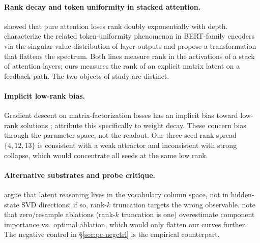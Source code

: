 \paragraph{Rank decay and token uniformity in stacked attention.}
\citet{dong2021attention} showed that pure attention loses rank
doubly exponentially with depth. \citet{yan2022uniformity}
characterize the related token-uniformity phenomenon in
BERT-family encoders via the singular-value distribution of layer
outputs and propose a transformation that flattens the spectrum.
Both lines measure rank in the activations of a stack of
attention layers; ours measures the rank of an explicit matrix
latent on a feedback path. The two objects of study are distinct.

\paragraph{Implicit low-rank bias.}
Gradient descent on matrix-factorization losses has an implicit
bias toward low-rank solutions
\citep{gunasekar2017implicit,arora2019implicit,razin2020implicit};
\citet{kobayashi2024weightdecay} attribute this specifically to
weight decay. These concern bias through the parameter space, not
the readout. Our three-seed rank spread $\{4,12,13\}$ is consistent
with a weak attractor and inconsistent with strong collapse, which
would concentrate all seeds at the same low rank.

\paragraph{Alternative substrates and probe critique.}
\citet{wang2025latentvocab} argue that latent reasoning lives in
the vocabulary column space, not in hidden-state SVD directions;
if so, rank-$k$ truncation targets the wrong observable.
\citet{li2024optimal} note that zero/resample ablations (rank-$k$
truncation is one) overestimate component importance vs.\ optimal
ablation, which would only flatten our curves further. The
negative control in \S\ref{sec:pc-negctrl} is the empirical
counterpart.
